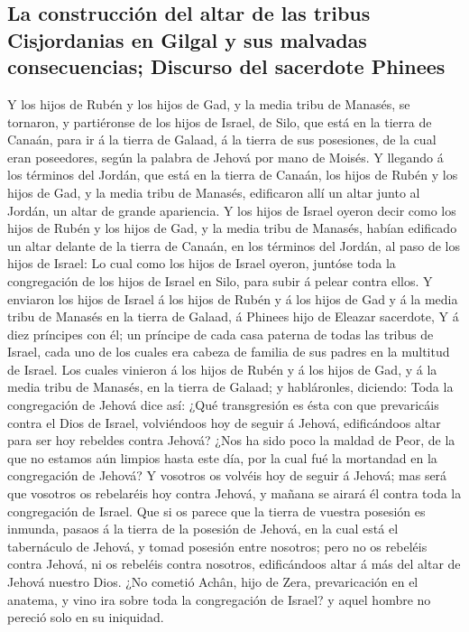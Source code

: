 \hypertarget{la-construcciuxf3n-del-altar-de-las-tribus-cisjordanias-en-gilgal-y-sus-malvadas-consecuencias-discurso-del-sacerdote-phinees}{%
\subsection{La construcción del altar de las tribus Cisjordanias en
Gilgal y sus malvadas consecuencias; Discurso del sacerdote
Phinees}\label{la-construcciuxf3n-del-altar-de-las-tribus-cisjordanias-en-gilgal-y-sus-malvadas-consecuencias-discurso-del-sacerdote-phinees}}

 Y los hijos de Rubén y los hijos de Gad, y la media tribu
de Manasés, se tornaron, y partiéronse de los hijos de Israel, de Silo,
que está en la tierra de Canaán, para ir á la tierra de Galaad, á la
tierra de sus posesiones, de la cual eran poseedores, según la palabra
de Jehová por mano de Moisés.  Y llegando á los términos
del Jordán, que está en la tierra de Canaán, los hijos de Rubén y los
hijos de Gad, y la media tribu de Manasés, edificaron allí un altar
junto al Jordán, un altar de grande apariencia.  Y los
hijos de Israel oyeron decir como los hijos de Rubén y los hijos de Gad,
y la media tribu de Manasés, habían edificado un altar delante de la
tierra de Canaán, en los términos del Jordán, al paso de los hijos de
Israel:  Lo cual como los hijos de Israel oyeron, juntóse
toda la congregación de los hijos de Israel en Silo, para subir á pelear
contra ellos.  Y enviaron los hijos de Israel á los hijos
de Rubén y á los hijos de Gad y á la media tribu de Manasés en la tierra
de Galaad, á Phinees hijo de Eleazar sacerdote,  Y á diez
príncipes con él; un príncipe de cada casa paterna de todas las tribus
de Israel, cada uno de los cuales era cabeza de familia de sus padres en
la multitud de Israel.  Los cuales vinieron á los hijos de
Rubén y á los hijos de Gad, y á la media tribu de Manasés, en la tierra
de Galaad; y habláronles, diciendo:  Toda la congregación
de Jehová dice así: ¿Qué transgresión es ésta con que prevaricáis contra
el Dios de Israel, volviéndoos hoy de seguir á Jehová, edificándoos
altar para ser hoy rebeldes contra Jehová?  ¿Nos ha sido
poco la maldad de Peor, de la que no estamos aún limpios hasta este día,
por la cual fué la mortandad en la congregación de Jehová? 
Y vosotros os volvéis hoy de seguir á Jehová; mas será que vosotros os
rebelaréis hoy contra Jehová, y mañana se airará él contra toda la
congregación de Israel.  Que si os parece que la tierra de
vuestra posesión es inmunda, pasaos á la tierra de la posesión de
Jehová, en la cual está el tabernáculo de Jehová, y tomad posesión entre
nosotros; pero no os rebeléis contra Jehová, ni os rebeléis contra
nosotros, edificándoos altar á más del altar de Jehová nuestro Dios.
 ¿No cometió Achân, hijo de Zera, prevaricación en el
anatema, y vino ira sobre toda la congregación de Israel? y aquel hombre
no pereció solo en su iniquidad.

